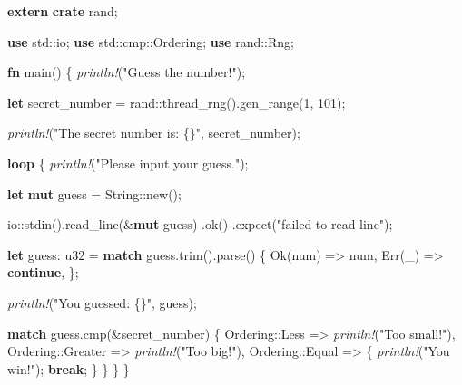 \documentclass[a4paper,]{book}
\newenvironment{Shaded}{\begin{snugshade}}{\end{snugshade}}
\newcommand{\KeywordTok}[1]{\textcolor[rgb]{0.13,0.29,0.53}{\textbf{{#1}}}}
\newcommand{\DataTypeTok}[1]{\textcolor[rgb]{0.13,0.29,0.53}{{#1}}}
\newcommand{\DecValTok}[1]{\textcolor[rgb]{0.00,0.00,0.81}{{#1}}}
\newcommand{\ConstantTok}[1]{\textcolor[rgb]{0.00,0.00,0.00}{{#1}}}
\newcommand{\StringTok}[1]{\textcolor[rgb]{0.31,0.60,0.02}{{#1}}}
\newcommand{\PreprocessorTok}[1]{\textcolor[rgb]{0.56,0.35,0.01}{\textit{{#1}}}}
\newcommand{\NormalTok}[1]{{#1}}
\begin{document}
\begin{Shaded}
\begin{Highlighting}[]
\KeywordTok{extern} \KeywordTok{crate} \NormalTok{rand;}

\KeywordTok{use} \NormalTok{std::io;}
\KeywordTok{use} \NormalTok{std::cmp::Ordering;}
\KeywordTok{use} \NormalTok{rand::Rng;}

\KeywordTok{fn} \NormalTok{main() \{}
    \PreprocessorTok{println!}\NormalTok{(}\StringTok{"Guess the number!"}\NormalTok{);}

    \KeywordTok{let} \NormalTok{secret_number = rand::thread_rng().gen_range(}\DecValTok{1}\NormalTok{, }\DecValTok{101}\NormalTok{);}

    \PreprocessorTok{println!}\NormalTok{(}\StringTok{"The secret number is: \{\}"}\NormalTok{, secret_number);}

    \KeywordTok{loop} \NormalTok{\{}
        \PreprocessorTok{println!}\NormalTok{(}\StringTok{"Please input your guess."}\NormalTok{);}

        \KeywordTok{let} \KeywordTok{mut} \NormalTok{guess = }\DataTypeTok{String}\NormalTok{::new();}

        \NormalTok{io::stdin().read_line(&}\KeywordTok{mut} \NormalTok{guess)}
            \NormalTok{.ok()}
            \NormalTok{.expect(}\StringTok{"failed to read line"}\NormalTok{);}

        \KeywordTok{let} \NormalTok{guess: }\DataTypeTok{u32} \NormalTok{= }\KeywordTok{match} \NormalTok{guess.trim().parse() \{}
            \ConstantTok{Ok}\NormalTok{(num) => num,}
            \ConstantTok{Err}\NormalTok{(_) => }\KeywordTok{continue}\NormalTok{,}
        \NormalTok{\};}

        \PreprocessorTok{println!}\NormalTok{(}\StringTok{"You guessed: \{\}"}\NormalTok{, guess);}

        \KeywordTok{match} \NormalTok{guess.cmp(&secret_number) \{}
            \NormalTok{Ordering::Less    => }\PreprocessorTok{println!}\NormalTok{(}\StringTok{"Too small!"}\NormalTok{),}
            \NormalTok{Ordering::Greater => }\PreprocessorTok{println!}\NormalTok{(}\StringTok{"Too big!"}\NormalTok{),}
            \NormalTok{Ordering::Equal   => \{}
                \PreprocessorTok{println!}\NormalTok{(}\StringTok{"You win!"}\NormalTok{);}
                \KeywordTok{break}\NormalTok{;}
            \NormalTok{\}}
        \NormalTok{\}}
    \NormalTok{\}}
\NormalTok{\}}
\end{Highlighting}
\end{Shaded}
\end{document}
